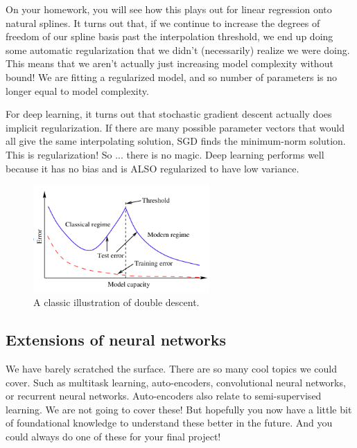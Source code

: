 On your homework, you will see how this plays out for linear regression onto natural splines. It turns out that, if we continue to increase the degrees of freedom of our spline basis past the interpolation threshold, we end up doing some automatic regularization that we didn't (necessarily) realize we were doing. This means that we aren't actually just increasing model complexity without bound! We are fitting a regularized model, and so number of parameters is no longer equal to model complexity. 

For deep learning, it turns out that stochastic gradient descent actually does implicit regularization. If there are many possible parameter vectors that would all give the same interpolating solution, SGD finds the minimum-norm solution. This is regularization! So ... there is no magic. Deep learning performs well because it has no bias and is ALSO regularized to have low variance. 

\begin{figure}
\centering 
\includegraphics[width=0.6\textwidth]{442_lecs/dd.png}
\caption{A classic illustration of double descent.}	
\label{fig_dd}
\end{figure}





\subsection{Extensions of neural networks}

We have barely scratched the surface. There are so many cool topics we could cover. Such as multitask learning, auto-encoders, convolutional neural networks, or recurrent neural networks. Auto-encoders also relate to semi-supervised learning. We are not going to cover these! But hopefully you now have a little bit of foundational knowledge to understand these better in the future. And you could always do one of these for your final project!




